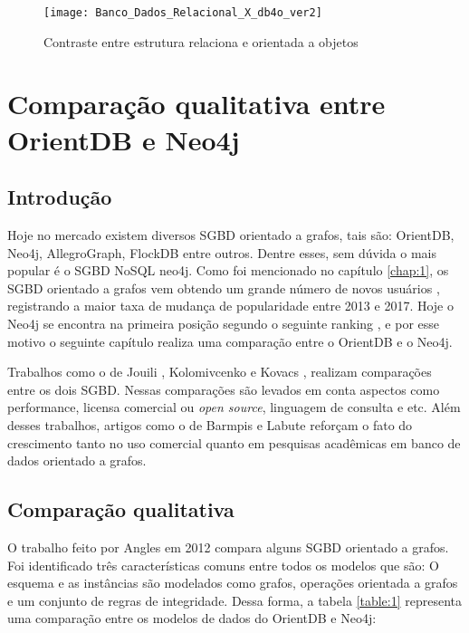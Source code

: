 \begin{figure}[h]
	\centering
    \texttt{[image: Banco\_Dados\_Relacional\_X\_db4o\_ver2]}
    \caption{Contraste entre estrutura relaciona e orientada a objetos}
    \label{fig:db4o}
\end{figure} 

\section{Comparação qualitativa entre OrientDB e Neo4j}

\subsection{Introdução}

	Hoje no mercado existem diversos SGBD orientado a grafos, tais são: OrientDB, Neo4j, AllegroGraph, FlockDB entre outros. Dentre esses, sem dúvida o mais popular é o SGBD NoSQL neo4j. Como foi mencionado no capítulo \ref{chap:1}, os SGBD orientado a grafos vem obtendo um grande número de novos usuários \cite{Dbmspopularity}, registrando a maior taxa de mudança de popularidade entre 2013 e 2017. Hoje o Neo4j se encontra na primeira posição segundo o seguinte ranking \cite{neo4jprimeiro}, e por esse motivo o seguinte capítulo realiza uma comparação entre o OrientDB e o Neo4j.
	
	Trabalhos como o de Jouili \cite{jouili2013empirical}, Kolomivcenko \cite{kolomivcenko2013experimental} e Kovacs \cite{kovacs2016cassandra}, realizam comparações entre os dois SGBD. Nessas comparações são levados em conta aspectos como performance, licensa comercial ou \textit{open source}, linguagem de consulta e etc. Além desses trabalhos, artigos como o de Barmpis \cite{barmpis2014evaluation} e Labute \cite{labute2014review} reforçam o fato do crescimento tanto no uso comercial quanto em pesquisas acadêmicas em banco de dados orientado a grafos.
	
\subsection{Comparação qualitativa}

	O trabalho feito por Angles \cite{angles2012comparison} em 2012 compara alguns SGBD orientado a grafos. Foi identificado três características comuns entre todos os modelos que são: O esquema e as instâncias são modelados como grafos, operações orientada a grafos e um conjunto de regras de integridade. Dessa forma, a tabela \ref{table:1} representa uma comparação entre os modelos de dados do OrientDB e Neo4j:
	
